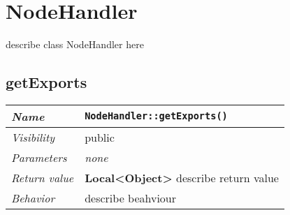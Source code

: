 \chapter{NodeHandler}
describe class NodeHandler here
\section{getExports}
\begin{longtable}{p{3cm} @{\hskip 1cm} p{12cm}}
 \hline
\textit{Name} & \texttt{NodeHandler::getExports()}\\
\hline
 \textit{Visibility} & public\\
\hline
\textit{Parameters} & \textit{none}\\
\hline
\textit{Return value} & \textbf{ Local<Object>} describe return value\\
  \hline
 \textit{Behavior} & describe beahviour \\
\hline
\end{longtable} \pagebreak
 